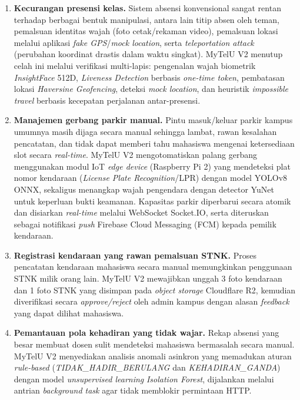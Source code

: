 \documentclass[12pt,titlepage,a4paper]{report}
\begin{document}
\begin{enumerate}
    \item \textbf{Kecurangan presensi kelas.} Sistem absensi konvensional sangat rentan terhadap berbagai bentuk manipulasi, antara lain titip absen oleh teman, pemalsuan identitas wajah (foto cetak/rekaman video), pemalsuan lokasi melalui aplikasi \textit{fake GPS}/\textit{mock location}, serta \textit{teleportation attack} (perubahan koordinat drastis dalam waktu singkat). MyTelU V2 menutup celah ini melalui verifikasi multi-lapis: pengenalan wajah biometrik \textit{InsightFace} 512D, \textit{Liveness Detection} berbasis \textit{one-time token}, pembatasan lokasi \textit{Haversine Geofencing}, deteksi \textit{mock location}, dan heuristik \textit{impossible travel} berbasis kecepatan perjalanan antar-presensi.
    \item \textbf{Manajemen gerbang parkir manual.} Pintu masuk/keluar parkir kampus umumnya masih dijaga secara manual sehingga lambat, rawan kesalahan pencatatan, dan tidak dapat memberi tahu mahasiswa mengenai ketersediaan slot secara \textit{real-time}. MyTelU V2 mengotomatiskan palang gerbang menggunakan modul IoT \textit{edge device} (Raspberry Pi 2) yang mendeteksi plat nomor kendaraan (\textit{License Plate Recognition}/LPR) dengan model YOLOv8 ONNX, sekaligus menangkap wajah pengendara dengan detector YuNet untuk keperluan bukti keamanan. Kapasitas parkir diperbarui secara atomik dan disiarkan \textit{real-time} melalui WebSocket Socket.IO, serta diteruskan sebagai notifikasi \textit{push} Firebase Cloud Messaging (FCM) kepada pemilik kendaraan.
    \item \textbf{Registrasi kendaraan yang rawan pemalsuan STNK.} Proses pencatatan kendaraan mahasiswa secara manual memungkinkan penggunaan STNK milik orang lain. MyTelU V2 mewajibkan unggah 3 foto kendaraan dan 1 foto STNK yang disimpan pada \textit{object storage} Cloudflare R2, kemudian diverifikasi secara \textit{approve/reject} oleh admin kampus dengan alasan \textit{feedback} yang dapat dilihat mahasiswa.
    \item \textbf{Pemantauan pola kehadiran yang tidak wajar.} Rekap absensi yang besar membuat dosen sulit mendeteksi mahasiswa bermasalah secara manual. MyTelU V2 menyediakan analisis anomali asinkron yang memadukan aturan \textit{rule-based} (\textit{TIDAK\_HADIR\_BERULANG} dan \textit{KEHADIRAN\_GANDA}) dengan model \textit{unsupervised learning} \textit{Isolation Forest}, dijalankan melalui antrian \textit{background task} agar tidak memblokir permintaan HTTP.
\end{enumerate}
\end{document}
